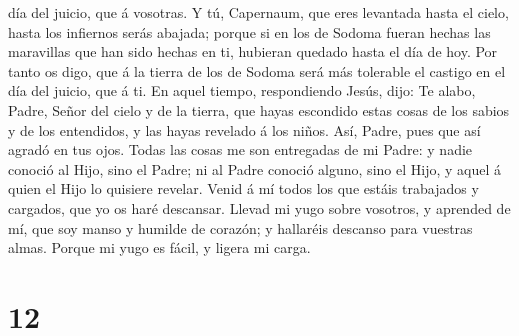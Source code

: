 día del juicio, que á vosotras.  Y tú, Capernaum, que eres
levantada hasta el cielo, hasta los infiernos serás abajada; porque si
en los de Sodoma fueran hechas las maravillas que han sido hechas en ti,
hubieran quedado hasta el día de hoy.  Por tanto os digo,
que á la tierra de los de Sodoma será más tolerable el castigo en el día
del juicio, que á ti.  En aquel tiempo, respondiendo Jesús,
dijo: Te alabo, Padre, Señor del cielo y de la tierra, que hayas
escondido estas cosas de los sabios y de los entendidos, y las hayas
revelado á los niños.  Así, Padre, pues que así agradó en
tus ojos.  Todas las cosas me son entregadas de mi Padre: y
nadie conoció al Hijo, sino el Padre; ni al Padre conoció alguno, sino
el Hijo, y aquel á quien el Hijo lo quisiere revelar. 
Venid á mí todos los que estáis trabajados y cargados, que yo os haré
descansar.  Llevad mi yugo sobre vosotros, y aprended de
mí, que soy manso y humilde de corazón; y hallaréis descanso para
vuestras almas.  Porque mi yugo es fácil, y ligera mi
carga.

\hypertarget{section-11}{%
\section{12}\label{section-11}}

